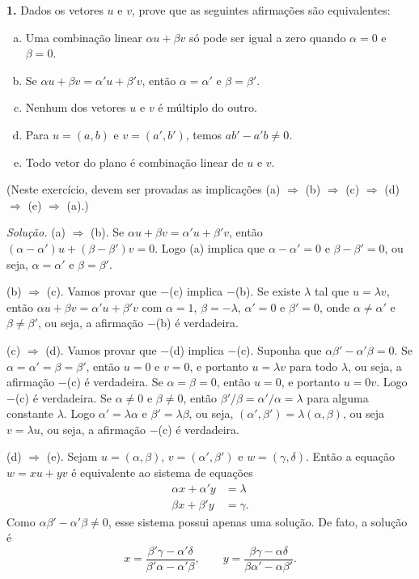 \documentclass[a4paper,11pt]{article}
\begin{document}
\textbf{1.}
Dados os vetores $u$ e $v$, prove que as seguintes afirmações são equivalentes:
\begin{enumerate}[(a)]
  \item
    Uma combinação linear $\alpha u + \beta v$ só pode ser igual a zero quando $\alpha = 0$ e $\beta = 0$.
  \item
    Se $\alpha u + \beta v = \alpha' u + \beta' v$, então $\alpha = \alpha'$ e $\beta = \beta'$.
  \item
    Nenhum dos vetores $u$ e $v$ é múltiplo do outro.
  \item
    Para $u = (a, b)$ e $v = (a', b')$, temos $a b' - a' b \neq 0$.
  \item
    Todo vetor do plano é combinação linear de $u$ e $v$.
\end{enumerate}
(Neste exercício, devem ser provadas as implicações (a) $\Rightarrow$ (b) $\Rightarrow$ (c) $\Rightarrow$ (d) $\Rightarrow$ (e) $\Rightarrow$ (a).)

\vspace{\baselineskip}

\emph{Solução.}
(a) $\Rightarrow$ (b).
Se $\alpha u + \beta v = \alpha' u + \beta' v$, então $(\alpha - \alpha')u + (\beta - \beta') v = 0$.
Logo (a) implica que $\alpha - \alpha' = 0$ e $\beta - \beta' = 0$, ou seja, $\alpha = \alpha'$ e $\beta = \beta'$.

(b) $\Rightarrow$ (c).
Vamos provar que $-$(c) implica $-$(b).
Se existe $\lambda$ tal que $u = \lambda v$, então $\alpha u + \beta v = \alpha' u + \beta' v$ com $\alpha = 1$, $\beta = -\lambda$, $\alpha' = 0$ e $\beta' = 0$, onde $\alpha \neq \alpha'$ e $\beta \neq \beta'$, ou seja, a afirmação $-$(b) é verdadeira.

(c) $\Rightarrow$ (d).
Vamos provar que $-$(d) implica $-$(c).
Suponha que $\alpha \beta' - \alpha' \beta = 0$.
Se $\alpha = \alpha' = \beta = \beta'$, então $u = 0$ e $v = 0$, e portanto $u = \lambda v$ para todo $\lambda$, ou seja, a afirmação $-$(c) é verdadeira.
Se $\alpha = \beta = 0$, então $u = 0$, e portanto $u = 0v$.
Logo $-$(c) é verdadeira.
Se $\alpha \neq 0$ e $\beta \neq 0$, então $\beta'/\beta = \alpha'/\alpha = \lambda$ para alguma constante $\lambda$.
Logo $\alpha' = \lambda \alpha$ e $\beta' = \lambda \beta$, ou seja, $(\alpha', \beta') = \lambda (\alpha, \beta)$, ou seja $v = \lambda u$, ou seja, a afirmação $-$(c) é verdadeira.

(d) $\Rightarrow$ (e).
Sejam $u = (\alpha,\beta)$, $v = (\alpha',\beta')$ e $w = (\gamma,\delta)$.
Então a equação $w = xu + yv$ é equivalente ao sistema de equações
\begin{align*}
  \alpha x + \alpha' y & = \lambda \\
  \beta x + \beta' y & = \gamma.
\end{align*}
Como $\alpha \beta' - \alpha' \beta \neq 0$, esse sistema possui apenas uma solução.
De fato, a solução é
\[
  x = \frac{\beta' \gamma - \alpha' \delta}{\beta' \alpha - \alpha' \beta}, \qquad y = \frac{\beta \gamma - \alpha \delta}{\beta \alpha' - \alpha \beta'}.
\]
\end{document}
